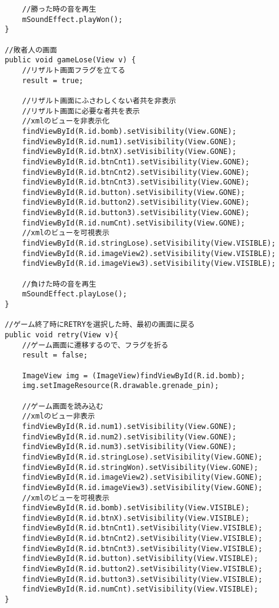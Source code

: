 \documentclass[11pt,a4j]{jarticle}
\begin{document}
\begin{verbatim}
        //勝った時の音を再生
        mSoundEffect.playWon();
    }

    //敗者人の画面
    public void gameLose(View v) {
        //リザルト画面フラグを立てる
        result = true;

        //リザルト画面にふさわしくない者共を非表示
        //リザルト画面に必要な者共を表示
        //xmlのビューを非表示化
        findViewById(R.id.bomb).setVisibility(View.GONE);
        findViewById(R.id.num1).setVisibility(View.GONE);
        findViewById(R.id.btnX).setVisibility(View.GONE);
        findViewById(R.id.btnCnt1).setVisibility(View.GONE);
        findViewById(R.id.btnCnt2).setVisibility(View.GONE);
        findViewById(R.id.btnCnt3).setVisibility(View.GONE);
        findViewById(R.id.button).setVisibility(View.GONE);
        findViewById(R.id.button2).setVisibility(View.GONE);
        findViewById(R.id.button3).setVisibility(View.GONE);
        findViewById(R.id.numCnt).setVisibility(View.GONE);
        //xmlのビューを可視表示
        findViewById(R.id.stringLose).setVisibility(View.VISIBLE);
        findViewById(R.id.imageView2).setVisibility(View.VISIBLE);
        findViewById(R.id.imageView3).setVisibility(View.VISIBLE);

        //負けた時の音を再生
        mSoundEffect.playLose();
    }

    //ゲーム終了時にRETRYを選択した時、最初の画面に戻る
    public void retry(View v){
        //ゲーム画面に遷移するので、フラグを折る
        result = false;

        ImageView img = (ImageView)findViewById(R.id.bomb);
        img.setImageResource(R.drawable.grenade_pin);

        //ゲーム画面を読み込む
        //xmlのビュー非表示
        findViewById(R.id.num1).setVisibility(View.GONE);
        findViewById(R.id.num2).setVisibility(View.GONE);
        findViewById(R.id.num3).setVisibility(View.GONE);
        findViewById(R.id.stringLose).setVisibility(View.GONE);
        findViewById(R.id.stringWon).setVisibility(View.GONE);
        findViewById(R.id.imageView2).setVisibility(View.GONE);
        findViewById(R.id.imageView3).setVisibility(View.GONE);
        //xmlのビューを可視表示
        findViewById(R.id.bomb).setVisibility(View.VISIBLE);
        findViewById(R.id.btnX).setVisibility(View.VISIBLE);
        findViewById(R.id.btnCnt1).setVisibility(View.VISIBLE);
        findViewById(R.id.btnCnt2).setVisibility(View.VISIBLE);
        findViewById(R.id.btnCnt3).setVisibility(View.VISIBLE);
        findViewById(R.id.button).setVisibility(View.VISIBLE);
        findViewById(R.id.button2).setVisibility(View.VISIBLE);
        findViewById(R.id.button3).setVisibility(View.VISIBLE);
        findViewById(R.id.numCnt).setVisibility(View.VISIBLE);
    }


\end{verbatim}
\end{document}
